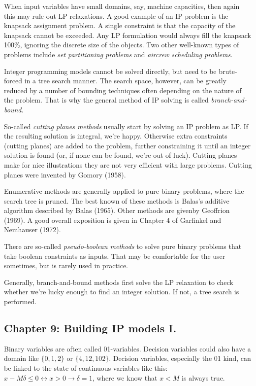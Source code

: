 \documentclass[13pt, letterpaper, twoside]{book}
\begin{document}
When input variables have small domains, say, machine capacities, then again this may rule out LP relaxations. A good example of an IP problem is the knapsack assignment problem. A single constraint is that the capacity of the knapsack cannot be exceeded. Any LP formulation would always fill the knapsack 100\%, ignoring the discrete size of the objects. Two other well-known types of problems include \textit{set partitioning problems} and \textit{aircrew scheduling problems}. 

Integer programming models cannot be solved directly, but need to be brute-forced in a tree search manner. The search space, however, can be greatly reduced by a number of bounding techniques often depending on the nature of the problem. That is why the general method of IP solving is called \textit{branch-and-bound}.

So-called \textit{cutting planes methods} usually start by solving an IP problem as LP. If the resulting solution is integral, we're happy. Otherwise extra constraints (cutting planes) are added to the problem, further constraining it until an integer solution is found (or, if none can be found, we're out of luck). Cutting planes make for nice illustrations they are not very efficient with large problems. Cutting planes were invented by Gomory (1958).

Enumerative methods are generally applied to pure binary problems, where the search tree is pruned. The best known of these methods is Balas's additive algorithm described by Balas (1965). Other methods are givenby Geoffrion (1969). A good overall exposition is given in Chapter 4 of Garfinkel and Nemhauser (1972).

There are so-called \textit{pseudo-boolean methods} to solve pure binary problems that take boolean constraints as inputs. That may be comfortable for the user sometimes, but is rarely used in practice.

Generally, branch-and-bound methods first solve the LP relaxation to check whether we're lucky enough to find an integer solution. If not, a tree search is performed. 

\subsection{Chapter 9: Building IP models I.}

Binary variables are often called 01-variables. Decision variables could also have a domain like $\{0,1,2\}$ or $\{4,12,102\}$. Decision variables, especially the 01 kind, can be linked to the state of continuous variables like this: $x-M\delta \leq 0 \leftrightarrow x>0 \rightarrow \delta = 1$, where we know that $x < M$ is always true.
\end{document}
